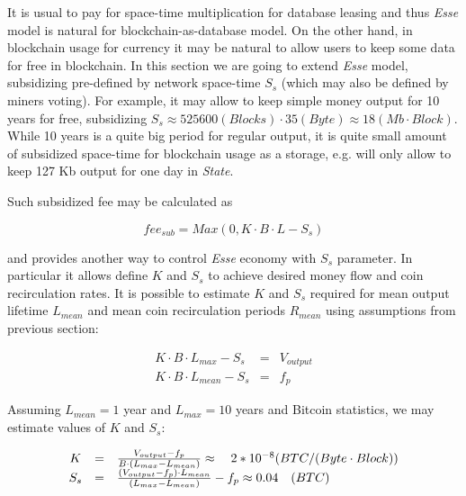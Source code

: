 \documentclass[]{article}   %
\newcommand{\esse}{\textit{Esse}}
\newcommand{\state}{\textit{State}}
\begin{document}
It is usual to pay for space-time multiplication for database leasing and thus \esse{} model is natural for blockchain-as-database model. On the other hand, in blockchain usage for currency it may be natural to allow users to keep some data for free in blockchain. In this section we are going to extend \esse{} model, subsidizing pre-defined by network space-time $S_s$ (which may also be defined by miners voting). For example, it may allow to keep simple money output for 10 years for free, subsidizing $S_s \approx 525600 (Blocks) \cdot 35 (Byte) \approx 18 (Mb \cdot Block)$. While 10 years is a quite big period for regular output, it is quite small amount of subsidized space-time for blockchain usage as a storage, e.g. will only allow to keep 127 Kb output for one day in \state{}.

Such subsidized fee may be calculated as

\begin{equation}
fee_{sub} = Max(0, K \cdot B \cdot L - S_s)
\end{equation}

and provides another way to control \esse{} economy with $S_s$ parameter. In particular it allows define $K$ and $S_s$ to achieve desired money flow and coin recirculation rates. It is possible to estimate $K$ and $S_s$ required for mean output lifetime $L_{mean}$ and mean coin recirculation periods $R_{mean}$ using assumptions from previous section:

\begin{equation}
  \begin{array}{ccl}
   K \cdot B \cdot L_{max} - S_s & = & V_{output} \\
   K \cdot B \cdot L_{mean} - S_s & = & f_p
  \end{array}
\end{equation}

Assuming $L_{mean}=1$ year and $L_{max}=10$ years and Bitcoin statistics, we may estimate values of $K$ and $S_s$:

\begin{equation}
  \begin{array}{ccl}
   K & = & {V_{output} - f_p \over B \cdot (L_{max} - L_{mean})} \approx \quad 2*10^{-8} ({BTC / (Byte \cdot Block)}) \\
   S_s & = & {(V_{output} - f_p) \cdot L_{mean} \over (L_{max} - L_{mean})} - f_p \approx 0.04\quad(BTC)
  \end{array}
\end{equation}
\end{document}
